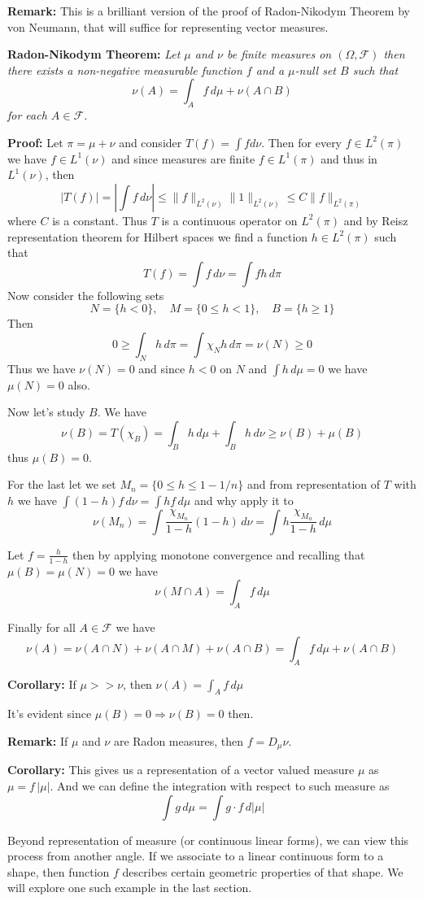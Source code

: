 \vspace{2ex}
\textbf{Remark:} This is a brilliant version of the proof of Radon-Nikodym
Theorem by von Neumann, that will suffice for representing vector measures.

\vspace{1ex}
\textbf{Radon-Nikodym Theorem:} \textit{Let $\mu$ and $\nu$ be finite measures
on $(\Omega, \mathcal F)$ then there exists a non-negative measurable function
$f$ and a $\mu$-null set $B$ such that
\[\nu(A) = \int_Af\,d\mu+\nu(A\cap B)\]
for each $A \in \mathcal F$.
}

\vspace{1ex}
\textbf{Proof:} Let $\pi=\mu+\nu$ and consider $T(f)=\int fd\nu$. Then for
every $f\in L^2(\pi)$ we have $f\in L^1(\nu)$ and since measures are finite
$f\in L^1(\pi)$ and thus in $L^1(\nu)$, then
\[|T(f)|=|\int f\,d\nu|\leq\|f\|_{L^2(\nu)}\|1\|_{L^2(\nu)}\leq C\|f\|_{L^2(\pi)}\]
where $C$ is a constant. Thus $T$ is a continuous operator on $L^2(\pi)$ and by
Reisz representation theorem for Hilbert spaces we find a function $h\in L^2(\pi)$
such that
\[T(f)=\int f\,d\nu=\int fh\,d\pi\]
Now consider the following sets
\[N=\{h<0\},\quad M=\{0\leq h<1\},\quad B=\{h\geq 1\}\]
Then
\[0\geq\int_N h\,d\pi=\int\chi_N h\,d\pi=\nu(N)\geq 0\]
Thus we have $\nu(N)=0$ and since $h<0$ on $N$ and $\int h\,d\mu=0$ we have
$\mu(N)=0$ also.

\vspace{1ex}
Now let's study $B$. We have
\[\nu(B)=T(\chi_B)=\int_Bh\,d\mu+\int_B h\,d\nu\geq\nu(B)+\mu(B)\]
thus $\mu(B)=0$.

For the last let we set $M_n=\{0\leq h\leq1-1/n\}$ and from representation of
$T$ with $h$ we have $\int(1-h)f\,d\nu=\int hf\,d\mu$ and why apply it to
\[\nu(M_n)=\int\frac{\chi_{M_n}}{1-h}(1-h)\,d\nu=\int h\frac{\chi_{M_n}}{1-h}\,d\mu\]

Let $f=\frac{h}{1-h}$ then by applying monotone convergence and recalling that
$\mu(B)=\mu(N)=0$ we have
\[\nu(M\cap A)=\int_A f\,d\mu\]

Finally for all $A\in\mathcal F$ we have
\[\nu(A)=\nu(A\cap N)+\nu(A\cap M)+\nu(A\cap B) = \int_A f\,d\mu+\nu(A\cap B)\]

\vspace{2ex}
\textbf{Corollary:} If $\mu >> \nu$, then $\nu(A)=\int_A f\,d\mu$

\vspace{1ex}
It's evident since $\mu(B)=0\Rightarrow\nu(B)=0$ then. 

\vspace{2ex}
\textbf{Remark:} If $\mu$ and $\nu$ are Radon measures, then $f=D_\mu\nu$.

\vspace{2ex}
\textbf{Corollary:}
This gives us a representation of a vector valued measure $\mu$ as $\mu=f\,|\mu|$.
And we can define the integration with respect to such measure as
\[
\int g\,d\mu = \int g\cdot f\,d|\mu|
\]

\vspace{2ex}
Beyond representation of measure (or continuous linear forms), we can view this
process from another angle. If we associate to a linear continuous
form to a shape, then function $f$ describes certain geometric properties of
that shape. We will explore one such example in the last section.

